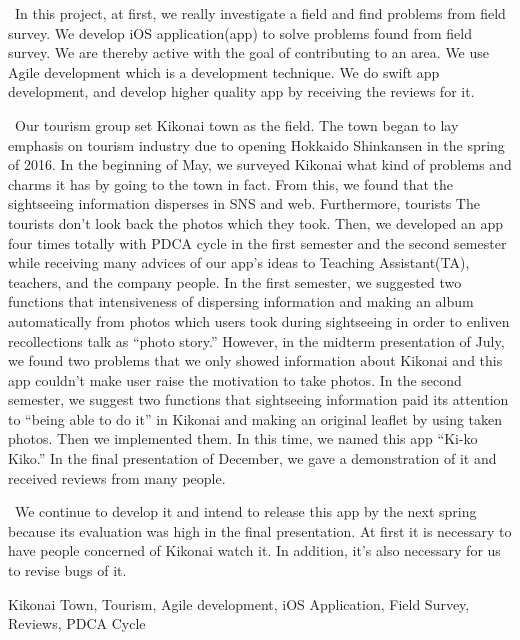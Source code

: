 \begin{eabstract} 

\ In this project, at first, we really investigate a field and find problems from field survey. We develop iOS application(app) to solve problems found from field survey. We are thereby active with the goal of contributing to an area. We use Agile development which is a development technique. We do swift app development, and develop higher quality app by receiving the reviews for it. 

\ Our tourism group set Kikonai town as the field. The town began to lay emphasis on tourism industry due to opening Hokkaido Shinkansen in the spring of 2016. In the beginning of May, we surveyed Kikonai what kind of problems and charms it has by going to the town in fact. From this, we found that the sightseeing information disperses in SNS and web. Furthermore, tourists The tourists don't look back the photos which they took. Then, we developed an app four times totally with PDCA cycle in the first semester and the second semester while receiving many advices of our app's ideas to Teaching Assistant(TA), teachers, and the company people. In the first semester, we suggested two functions that intensiveness of dispersing information and making an album automatically from photos which users took during sightseeing in order to enliven recollections talk as ``photo story.'' However, in the midterm presentation of July, we found two problems that we only showed information about Kikonai and this app couldn't make user raise the motivation to take photos. In the second semester, we suggest two functions that sightseeing information paid its attention to ``being able to do it'' in Kikonai and making an original leaflet by using taken photos. Then we implemented them. In this time, we named this app ``Ki-ko Kiko.'' In the final presentation of December, we gave a demonstration of it and received reviews from many people.

\ We continue to develop it and intend to release this app by the next spring because its evaluation was high in the final presentation. At first it is necessary to have people concerned of Kikonai watch it. In addition, it's also necessary for us to revise bugs of it.



\begin{ekeyword}
Kikonai Town, Tourism, Agile development, iOS Application, Field Survey, Reviews, PDCA Cycle
\end{ekeyword}
\end{eabstract}